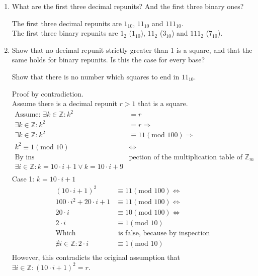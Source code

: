 \documentclass[10pt,\jkfside,a4paper]{article}
\begin{document}
\begin{enumerate}
\begin{enumerate}

\item What are the first three decimal repunits? And the first three binary ones?

The first three decimal repunits are $1_{10}$, $11_{10}$ and $111_{10}$.\\
The first three binary repunits are $1_2$ ($1_{10}$), $11_2$ ($3_{10}$) and $111_2$ ($7_{10}$).\\

\item Show that no decimal repunit strictly greater than 1 is a square, and that the same holds 
for binary repunits. Is this the case for every base?

Show that there is no number which squares to end in $11_{10}$.
\begin{center}
Proof by contradiction. \\
Assume there is a decimal repunit $r > 1$ that is a square.
\begin{equation}
\begin{split}
\text{Assume: }\exists k \in \mathbb{Z}: k^2 &= r\\
\exists k \in \mathbb{Z}: k^2 &= r\Longrightarrow\\
\exists k \in \mathbb{Z}: k^2 &\equiv 11(\text{mod } 100)\Longrightarrow\\
k^2 \equiv 1(\text{mod } 10) &\Longleftrightarrow\\
\text{By ins}&\text{pection of the multiplication table of }\mathbb{Z}_m\\
\exists i \in \mathbb{Z}: k = 10\cdot i + 1 \vee k = 10\cdot i + 9\\
\end{split}
\end{equation}
Case 1: $k = 10\cdot i + 1$
\begin{equation}
\begin{split}
(10\cdot i + 1)^2 &\equiv 11(\text{mod } 100)\Longleftrightarrow\\
100\cdot i^2 + 20\cdot i + 1 &\equiv 11(\text{mod } 100)\Longleftrightarrow\\
20\cdot i &\equiv 10 (\text{mod } 100)\Longleftrightarrow\\
2\cdot i &\equiv 1(\text{mod } 10)\\
\text{Which}&\text{ is false, because by inspection}\\
\nexists i \in \mathbb{Z}: 2\cdot i &\equiv 1(\text{mod } 10)\\
\end{split}
\end{equation}
However, this contradicts the original assumption that $\exists i \in \mathbb{Z}: (10\cdot i + 1)^2 = r$.


\end{center}
\end{enumerate}
\end{enumerate}
\end{document}
